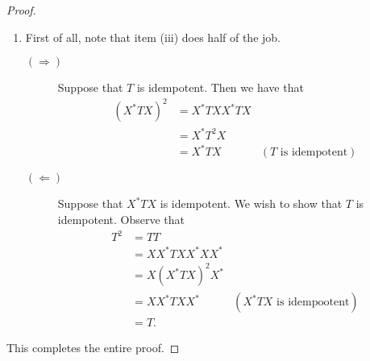\begin{proof}
\begin{enumerate}[label=(\roman*)]
	\item First of all, note that item (iii) does half of the job. 
	    \begin{description}
		\item[$\left( \Longrightarrow \right)$] Suppose that $T$ is idempotent. Then we have that 
		    \begin{align*}
			\left( X^{*}TX \right)^{2} &=  X^{*}TXX^{*}TX \\
			&= X^{*}T^{2}X \\
			&= X^{*} TX & (T \text{ is idempotent})
		    \end{align*}
		\item[$\left( \Longleftarrow \right)$] Suppose that $X^{*}TX$ is idempotent. We wish to show that $T$ is idempotent. Observe that 
		    \begin{align*}
			T^{2} &=  TT \\
			&= XX^{*}TXX^{*}XX^{*} \\
			&= X\left( X^{*}TX \right)^{2}X^{*} \\
			&= X X^{*}TXX^{*} & (X^{*}TX \text{ is idempootent}) \\
			&= T.
		    \end{align*}
	    \end{description}
    \end{enumerate}

    This completes the entire proof.
\end{proof}
